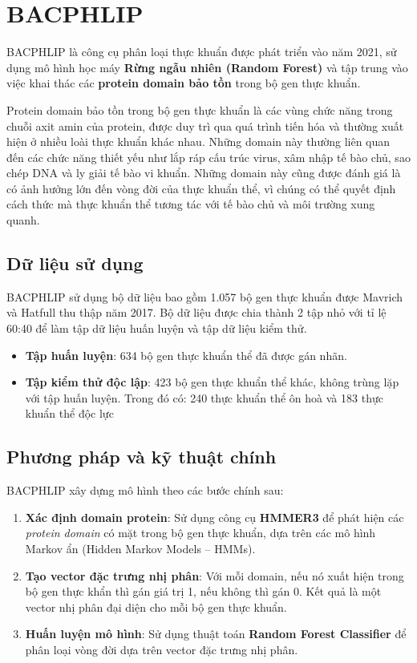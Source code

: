 \section{BACPHLIP}

BACPHLIP \cite{hockenberry2021bacphlip} là công cụ phân loại thực khuẩn được phát triển vào năm 2021, sử dụng mô hình học máy \textbf{Rừng ngẫu nhiên (Random Forest)} và tập trung vào việc khai thác các \textbf{protein domain bảo tồn} trong bộ gen thực khuẩn. 

Protein domain bảo tồn trong bộ gen thực khuẩn là các vùng chức năng trong chuỗi axit amin của protein, được duy trì qua quá trình tiến hóa và thường xuất hiện ở nhiều loài thực khuẩn khác nhau. Những domain này thường liên quan đến các chức năng thiết yếu như lắp ráp cấu trúc virus, xâm nhập tế bào chủ, sao chép DNA và ly giải tế bào vi khuẩn. Những domain này cũng được đánh giá là có ảnh hưởng lớn đến vòng đời của thực khuẩn thể, vì chúng có thể quyết định cách thức mà thực khuẩn thể tương tác với tế bào chủ và môi trường xung quanh.


\subsection*{Dữ liệu sử dụng}
BACPHLIP sử dụng bộ dữ liệu bao gồm 1.057 bộ gen thực khuẩn được Mavrich và Hatfull thu thập năm 2017. Bộ dữ liệu được chia thành 2 tập nhỏ với tỉ lệ 60:40 để làm tập dữ liệu huấn luyện và tập dữ liệu kiểm thử. 
\begin{itemize}
    \item \textbf{Tập huấn luyện}: 634 bộ gen thực khuẩn thể đã được gán nhãn.
    \item \textbf{Tập kiểm thử độc lập}: 423 bộ gen thực khuẩn thể khác, không trùng lặp với tập huấn luyện. Trong đó có: 240 thực khuẩn thể ôn hoà và 183 thực khuẩn thể độc lực
\end{itemize}

\subsection*{Phương pháp và kỹ thuật chính}

BACPHLIP xây dựng mô hình theo các bước chính sau:

\begin{enumerate}
    \item \textbf{Xác định domain protein}: Sử dụng công cụ \textbf{HMMER3} để phát hiện các \textit{protein domain} có mặt trong bộ gen thực khuẩn, dựa trên các mô hình Markov ẩn (Hidden Markov Models – HMMs).
    
    \item \textbf{Tạo vector đặc trưng nhị phân}: Với mỗi domain, nếu nó xuất hiện trong bộ gen thực khẩn thì gán giá trị 1, nếu không thì gán 0. Kết quả là một vector nhị phân đại diện cho mỗi bộ gen thực khuẩn.
    
    \item \textbf{Huấn luyện mô hình}: Sử dụng thuật toán \textbf{Random Forest Classifier} để phân loại vòng đời dựa trên vector đặc trưng nhị phân.
\end{enumerate}

